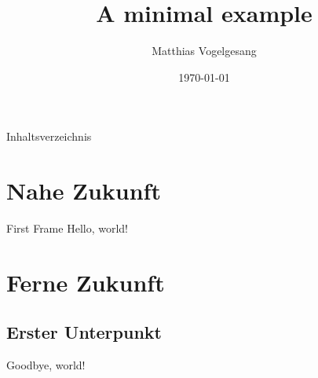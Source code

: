 \documentclass{beamer}
\title{A minimal example}
\date{\today}
\author{Matthias Vogelgesang}
\institute{Centre for Modern Beamer Themes}
\begin{document}
\maketitle

\begin{frame}{Inhaltsverzeichnis}
	\tableofcontents[sectionstyle=show,subsectionstyle=show]
\end{frame}

\section{Nahe Zukunft}
\begin{frame}{First Frame}
	Hello, world!
\end{frame}

\section{Ferne Zukunft}
\subsection{Erster Unterpunkt}
\begin{frame}{\insertsubsection}
	Goodbye, world!
\end{frame}
\end{document}
